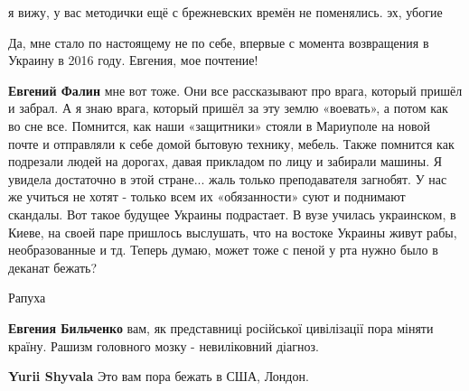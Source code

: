 \begin{itemize}
\begin{itemize}

я вижу, у вас методички ещё с брежневских времён не поменялись. эх, убогие

\end{itemize}


Да, мне стало по настоящему не по себе, впервые с момента возвращения в Украину
в 2016 году. Евгения, мое почтение!

\begin{itemize}

\textbf{Евгений Фалин} мне вот тоже. Они все рассказывают про врага, который
пришёл и забрал. А я знаю врага, который пришёл за эту землю «воевать», а потом
как во сне все. Помнится, как наши «защитники» стояли в Мариуполе на новой
почте и отправляли к себе домой бытовую технику, мебель. Также помнится как
подрезали людей на дорогах, давая прикладом по лицу и забирали машины. Я
увидела достаточно в этой стране... жаль только преподавателя загнобят. У нас
же учиться не хотят - только всем их «обязанности» суют и поднимают скандалы.
Вот такое будущее Украины подрастает. В вузе училась украинском, в Киеве, на
своей паре пришлось выслушать, что на востоке Украины живут рабы,
необразованные и тд. Теперь думаю, может тоже с пеной у рта нужно было в
деканат бежать?
\end{itemize}


Рапуха


\textbf{Евгения Бильченко} вам, як представниці російської цивілізації пора
міняти країну. Рашизм головного мозку - невиліковний діагноз.

\begin{itemize}

\textbf{Yurii Shyvala} Это вам пора бежать в США, Лондон.


\end{itemize}
\end{itemize}
